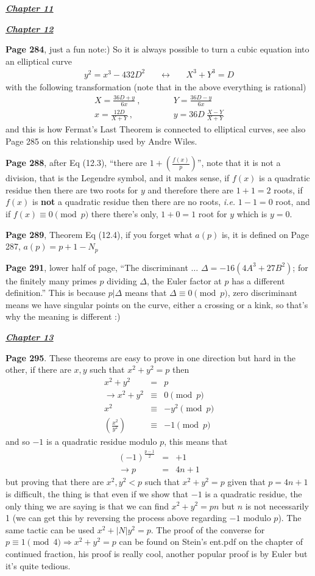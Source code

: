 \documentclass[aps,preprint,preprintnumbers,nofootinbib,showpacs,prd]{revtex4-1}
\newcommand{\ie}{{\it i.e.} }
\newcommand{\nbea}{\begin{eqnarray*}}
\newcommand{\neea}{\end{eqnarray*}}
\begin{document}
\bigskip
\underline{\textbf{\textit{Chapter 11}}}
\bigskip


\bigskip
\underline{\textbf{\textit{Chapter 12}}}
\bigskip

{\bf Page 284}, just a fun note:) So it is always possible to turn a cubic equation into an elliptical curve 
%
\nbea
y^2 = x^3 - 432D^2 & ~~~~~ \longleftrightarrow ~~~~~& X^3 + Y^3 = D
\neea
%
with the following transformation (note that in the above everything is rational)
%
\nbea
X = \frac{36D+y}{6x}~, &~~~~~~~~~~& Y = \frac{36D-y}{6x} \\
x = \frac{12D}{X+Y}~, &~~~~~~~~~~& y = 36D~\frac{X-Y}{X+Y}
\neea
%
and this is how Fermat's Last Theorem is connected to elliptical curves, see also Page 285 on this relationship used by Andre Wiles.

{\bf Page 288}, after Eq (12.3), ``there are $1 + \left(\frac{f(x)}{p}\right)$'', note that it is not a division, that is the Legendre symbol, and it makes sense, if $f(x)$ is a quadratic residue then there are two roots for $y$ and therefore there are $1+1=2$ roots, if $f(x)$ is {\bf not} a quadratic residue then there are no roots, \ie $1-1=0$ root, and if $f(x) \equiv 0 \pmod{p}$ there there's only, $1+0=1$ root for $y$ which is $y=0$.

{\bf Page 289}, Theorem Eq (12.4), if you forget what $a(p)$ is, it is defined on Page 287, $a(p) = p+1-N_p$

{\bf Page 291}, lower half of page, ``The discriminant $\ldots$ $\Delta=-16(4A^3 + 27B^2)$; for the finitely many primes $p$ dividing $\Delta$, the Euler factor at $p$ has a different definition.'' This is because $p|\Delta$ means that $\Delta \equiv 0 \pmod{p}$, zero discriminant means we have singular points on the curve, either a crossing or a kink, so that's why the meaning is different :)

\bigskip
\underline{\textit{\textbf{Chapter 13}}}
\bigskip

{\bf Page 295}. These theorems are easy to prove in one direction but hard in the other, if there are $x,y$ such that $x^2 + y^2 = p$ then
%
\nbea
x^2 + y^2 & = & p \\
\to x^2 + y^2 & \equiv & 0 \pmod{p} \\
x^2 & \equiv & -y^2 \pmod{p} \\
\left(\frac{x^2}{y^2}\right) & \equiv & -1 \pmod{p}
\neea
%
and so $-1$ is a quadratic residue modulo $p$, this means that
%
\nbea
(-1)^{\frac{p-1}{2}} & = & +1 \\
\to p & = & 4n + 1
\neea
%
but proving that there are $x^2,y^2 < p$ such that $x^2+y^2=p$ given that $p = 4n+1$ is difficult, the thing is that even if we show that $-1$ is a quadratic residue, the only thing we are saying is that we can find $x^2 + y^2 = pn$ but $n$ is not necessarily 1 (we can get this by reversing the process above regarding $-1$ modulo $p$). The same tactic can be used $x^2 + |N|y^2 = p$. The proof of the converse for $p\equiv 1 \pmod{4} \Rightarrow x^2+y^2 = p$ can be found on Stein's ent.pdf on the chapter of continued fraction, his proof is really cool, another popular proof is by Euler but it's quite tedious.
\end{document}
